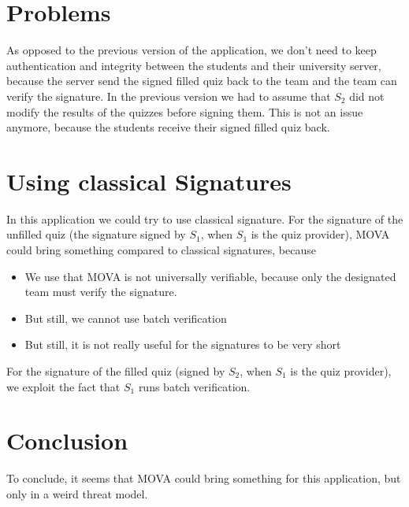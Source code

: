 \documentclass[12pt,a4paper]{article}
\begin{document}
    \section{Problems}
    As opposed to the previous version of the application, we don't need to keep authentication and integrity between the students and their university server, because the server send 
    the signed filled quiz back to the team and the team can verify the signature.    
    In the previous version we had to assume that $S_2$ did not modify the results of the quizzes before signing them. This is not an issue anymore, because the students receive 
    their signed filled quiz back.

    \section{Using classical Signatures}
    In this application we could try to use classical signature. For the signature of the unfilled quiz (the signature signed by $S_1$, when $S_1$ is the quiz provider), 
    MOVA could bring something compared to classical signatures, because
    \begin{itemize}
        \item We use that MOVA is not universally verifiable, because only the designated team must verify the signature.
        \item But still, we cannot use batch verification
        \item But still, it is not really useful for the signatures to be very short
    \end{itemize}
    For the signature of the filled quiz (signed by $S_2$, when $S_1$ is the quiz provider), we exploit the fact that $S_1$
    runs batch verification. 

    \section{Conclusion}
    To conclude, it seems that MOVA could bring something for this application, but only in a weird threat model.
\end{document}
